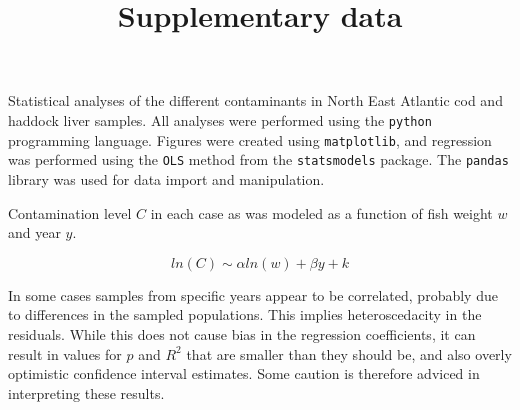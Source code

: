 \documentclass[11pt,a4paper]{article}
\title{Supplementary data}
\author{}
\date{}
\begin{document}
\maketitle

Statistical analyses of the different contaminants in North East
Atlantic cod and haddock liver samples.  All analyses were performed
using the \texttt{python} programming language.  Figures were created
using \texttt{matplotlib}, and regression was performed using the
\texttt{OLS} method from the \texttt{statsmodels} package.  The
\texttt{pandas} library was used for data import and manipulation.

Contamination level $C$ in each case as was modeled as a function of
fish weight $w$ and year $y$.

\begin{equation*}
ln(C) \sim \alpha ln(w) + \beta y + k
\end{equation*}

In some cases samples from specific years appear to be correlated,
probably due to differences in the sampled populations.  This implies
heteroscedacity in the residuals. While this does not cause bias in
the regression coefficients, it can result in values for $p$ and $R^2$
that are smaller than they should be, and also overly optimistic
confidence interval estimates.  Some caution is therefore adviced in
interpreting these results.

\end{document}

